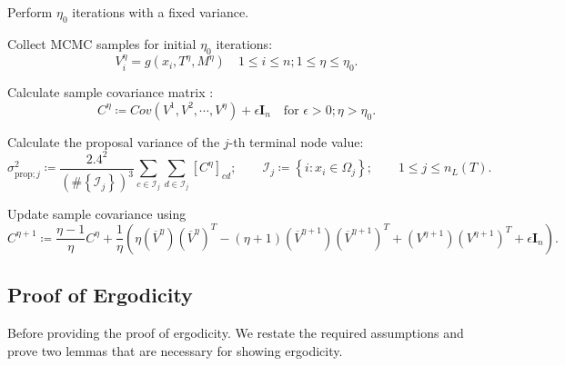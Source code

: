\documentclass[
12pt]{article}
\begin{document}
\begin{algorithm}[h]
	\caption{Computation of adaptive proposal}\label{alg:ada:prop}
	\begin{algorithmic}[1]
		\State Perform $\eta_0$ iterations with a fixed variance.
		
		\State Collect MCMC samples for initial $\eta_0$ iterations:
		\begin{equation*}
			V_{i}^{\eta} = g\left(x_i,T^{\eta},M^{\eta}\right)\quad 1\le i \le n; 1\le \eta \le \eta_0.
		\end{equation*}
		
		\State Calculate sample covariance matrix :
		\begin{equation*}
			C^{\eta} \coloneqq Cov\left(V^{1},V^{2},\cdots,V^{\eta}\right) + \epsilon\mathbf{I}_n \quad \text{for } \epsilon>0; \eta>\eta_0.
		\end{equation*}
		
		\State Calculate the proposal variance of the $j$-th terminal node value:
		\begin{equation*}
			\sigma_{\text{prop};j}^2 \coloneqq \frac{2.4^2}{\left(\#\left\{\mathcal{I}_{j}\right\}\right)^3}
			\sum_{c\in\mathcal{I}_{j}}\sum_{d\in\mathcal{I}_{j}}\left[C^{\eta}\right]_{cd};\qquad\mathcal{I}_{j}\coloneqq \left\{i:x_i\in \Omega_{j}\right\};\qquad 1\le j\le n_L(T).
		\end{equation*}
		
		\State Update sample covariance using 
		\begin{equation*}
			C^{\eta+1} \coloneqq 
			\frac{\eta-1}{\eta} C^{\eta} 
			+ \frac{1}{\eta}\left(\eta 
			\left(\overline{V}^{\eta}\right)\left(\overline{V}^{\eta}\right)^T 
			- (\eta+1)\left(\overline{V}^{\eta+1}\right)\left(\overline{V}^{\eta+1}\right)^T 
			+ \left({V}^{\eta+1}\right)\left({V}^{\eta+1}\right)^T + \epsilon\mathbf{I}_n\right).
		\end{equation*}
	\end{algorithmic}
\end{algorithm}



\subsection{Proof of Ergodicity}

Before providing the proof of ergodicity. We restate the required assumptions and prove two lemmas that are necessary for showing ergodicity.
\end{document}
